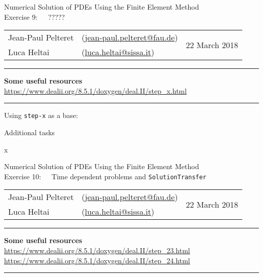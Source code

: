 \documentclass[11pt,answers]{exam}
\makeatletter
\newcommand{\makeheader}[3]{%
\setcounter{question}{0}
\begin{center}
{\sc Numerical Solution of PDEs Using the Finite Element Method}\vspace{2ex}\\
{\sc Exercise #1:\ \ \ #2}\vspace{2ex}\\
\begin{tabular*}{\textwidth}{ll @{\extracolsep{\fill}}r}
Jean-Paul Pelteret & (\url{jean-paul.pelteret@fau.de}) & \multirow{2}{*}{#3} \\
Luca Heltai & (\url{luca.heltai@sissa.it}) & \\
\end{tabular*}
\end{center}
}
\newcommand{\makeresources}[1]{%
\rule{\textwidth}{0.6mm}
\textbf{Some useful resources}\\[1.5ex]
#1 \\
\rule{\textwidth}{0.6mm}
}
\makeatother
\begin{document}
%
%
%
%
%
%




\clearpage
\makeheader{9}{?????}{22 March 2018}
\makeresources{%
\url{https://www.dealii.org/8.5.1/doxygen/deal.II/step_x.html}
}

\begin{questions}

\question Using \verb|step-x| as a base:

\question Additional tasks
\begin{parts}
\bonuspart x
\end{parts}

\end{questions}




\clearpage
\makeheader{10}{Time dependent problems and \texttt{SolutionTransfer}}{22 March 2018}
\makeresources{%
\url{https://www.dealii.org/8.5.1/doxygen/deal.II/step_23.html} \\
\url{https://www.dealii.org/8.5.1/doxygen/deal.II/step_24.html}
}
\end{document}
